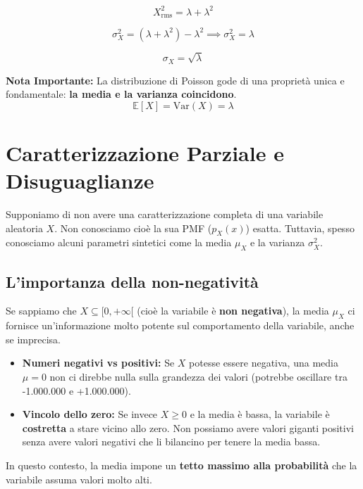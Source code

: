 \begin{equation}
\boxed{X^2_{\text{rms}} = \lambda + \lambda^2}
\end{equation}

\begin{equation}
\sigma_X^2 = (\lambda + \lambda^2) - \lambda^2 \implies \boxed{\sigma_X^2 = \lambda}
\end{equation}

\begin{equation}
\boxed{\sigma_X = \sqrt{\lambda}}
\end{equation}

\textbf{Nota Importante:} La distribuzione di Poisson gode di una proprietà unica e fondamentale: \textbf{la media e la varianza coincidono}.
\[ \mathbb{E}[X] = \text{Var}(X) = \lambda \] 

\section{Caratterizzazione Parziale e Disuguaglianze}

Supponiamo di non avere una caratterizzazione completa di una variabile aleatoria $X$. 
Non conosciamo cioè la sua PMF ($p_X(x)$) esatta. Tuttavia, spesso conosciamo alcuni parametri sintetici come la media $\mu_X$ e la varianza $\sigma_X^2$.

\subsection{L'importanza della non-negatività}
Se sappiamo che $X \subseteq [0, +\infty[$ (cioè la variabile è \textbf{non negativa}), la media $\mu_X$ ci fornisce un'informazione molto potente sul comportamento della variabile, anche se imprecisa.

\begin{itemize}
    \item \textbf{Numeri negativi vs positivi:} Se $X$ potesse essere negativa, una media $\mu=0$ non ci direbbe nulla sulla grandezza dei valori (potrebbe oscillare tra -1.000.000 e +1.000.000).
    \item \textbf{Vincolo dello zero:} Se invece $X \ge 0$ e la media è bassa, la variabile è \textbf{costretta} a stare vicino allo zero. Non possiamo avere valori giganti positivi senza avere valori negativi che li bilancino per tenere la media bassa.
\end{itemize}

In questo contesto, la media impone un \textbf{tetto massimo alla probabilità} che la variabile assuma valori molto alti.

